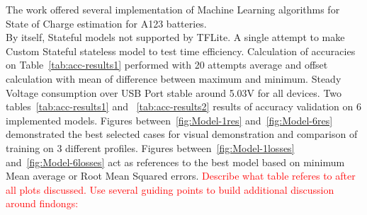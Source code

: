 The work offered several implementation of Machine Learning algorithms for State of Charge estimation for A123 batteries. \\
By itself, Stateful models not supported by TFLite. A single attempt to make Custom Stateful stateless model to test time efficiency.
Calculation of accuracies on Table~\ref{tab:acc-results1} performed with 20 attempts average and offset calculation with mean of difference between maximum and minimum.
Steady Voltage consumption over USB Port stable around 5.03V for all devices. %
Two tables~\ref{tab:acc-results1} and ~\ref{tab:acc-results2} results of accuracy validation on 6 implemented models.
Figures between~\ref{fig:Model-1res} and~\ref{fig:Model-6res} demonstrated the best selected cases for visual demonstration and comparison of training on 3 different profiles.
Figures between~\ref{fig:Model-1losses} and~\ref{fig:Model-6losses} act as references to the best model based on minimum Mean average or Root Mean Squared errors.
\textcolor{red}{Describe what table referes to after all plots discussed. Use several guiding points to build additional discussion around findongs:}

